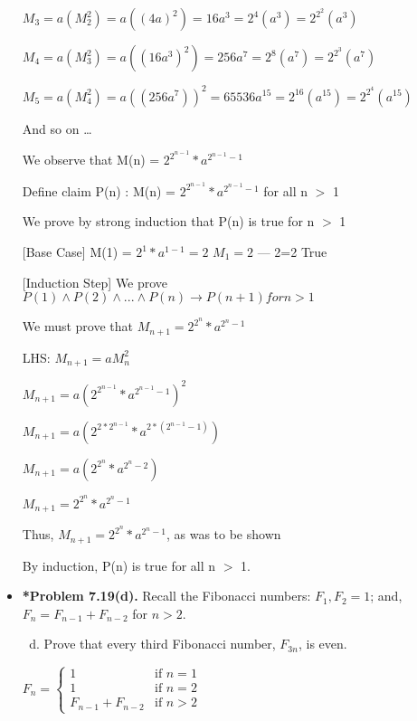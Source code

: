 \documentclass[11pt]{article}
\def\imp{\rightarrow}
\begin{document}
\begin{itemize}
$M_3 = a(M_2^2) = a((4a)^2) = 16a^3 = 2^4(a^3) = 2^{2^2}(a^3)$

$M_4 = a(M_3^2) = a((16a^3)^2) = 256a^7 = 2^8(a^7) = 2^{2^3}(a^7)$

$M_5 = a(M_4^2) = a((256a^7))^2 = 65536a^15 = 2^{16}(a^{15}) = 2^{2^4}(a^{15})$

And so on \dots

We observe that M(n) = $2^{2^{n-1}} * a^{2^{n-1} - 1} $

Define claim P(n) : M(n) = $2^{2^{n-1}} * a^{2^{n-1} - 1} $ for all n $>$ 1

We prove by strong induction that P(n) is true for n $>$ 1

[Base Case] M(1) = $2^1 * a^{1-1} = 2 $ $M_1 = 2$ --- 2=2 True

[Induction Step] We prove $P(1) \land P(2) \land ... \land P(n) \imp P(n+1) for n > 1 $

We must prove that $M_{n+1} = 2^{2^{n}} * a^{2^{n} - 1}$

LHS: $M_{n+1} = aM_{n}^2$

$M_{n+1} = a(2^{2^{n-1}}*a^{2^{n-1}-1})^2$

$M_{n+1} = a(2^{2 * 2^{n-1}}*a^{2 * (2^{n-1}-1)})$

$M_{n+1} = a(2^{2^n} * a^{2^n - 2})$

$M_{n+1} = 2^{2^n} * a^{2^n-1}$

Thus, $M_{n+1} = 2^{2^n} * a^{2^n-1}$, as was to be shown

By induction, P(n) is true for all n $>$ 1.

\vspace{0.1in}

\item \textbf{*Problem 7.19(d).}
Recall the Fibonacci numbers: $F_1,F_2=1$; and, $F_n=F_{n-1}+F_{n-2}$ for $n>2$.
\begin{enumerate}[(a)]
\setcounter{enumi}{3}
\item Prove that every third Fibonacci number, $F_{3n}$, is even.
\end{enumerate}

$ F_n = 
\begin{cases}
  1 & \text{if } n = 1 \\
  1 & \text{if } n = 2 \\
  F_{n-1} + F_{n-2} & \text{if } n > 2

  
\end{cases}
$

\vspace{0.1in}


\end{itemize}
\end{document}
